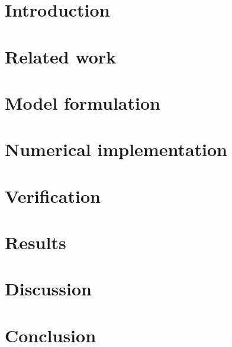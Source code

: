 \documentclass[a4paper,fleqn]{cas-sc}
\begin{document}
\maketitle


\section{Introduction}
\label{sec:intro}

\section{Related work}
\label{sec:related}

\section{Model formulation}
\label{sec:model}

\section{Numerical implementation}
\label{sec:numerics}

\section{Verification}
\label{sec:verification}

\section{Results}
\label{sec:results}

\section{Discussion}
\label{sec:discussion}

\section{Conclusion}
\label{sec:conclusion}




\end{document}

